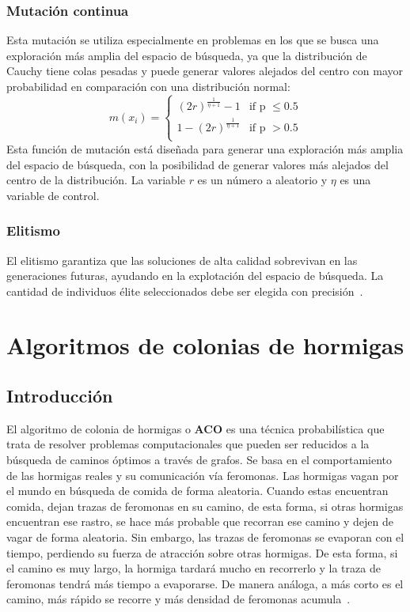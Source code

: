 \subsubsection{Mutación continua}
Esta mutación se utiliza especialmente en problemas en los que se busca una exploración más amplia del espacio de búsqueda, ya que la distribución de Cauchy tiene colas pesadas y puede generar valores alejados del centro con mayor probabilidad en comparación con una distribución normal:
\begin{equation}
    m(x_i) =
      \begin{cases}
        (2r)^{\frac{1}{\eta+1}}-1 & \text{if p $\leq 0.5$}\\
        1-(2r)^{\frac{1}{\eta+1}} & \text{if p $> 0.5$}\\
      \end{cases}       
\end{equation}
Esta función de mutación está diseñada para generar una exploración más amplia del espacio de búsqueda, con la posibilidad de generar valores más alejados del centro de la distribución. La variable $r$ es un número a aleatorio y $\eta$ es una variable de control.

\subsubsection{Elitismo}
El elitismo garantiza que las soluciones de alta calidad sobrevivan en las generaciones futuras, ayudando en la explotación del espacio de búsqueda. La cantidad de individuos élite seleccionados debe ser elegida con precisión~\cite{mirjalili2019genetic}.

\section{Algoritmos de colonias de hormigas}
\subsection{Introducción}
El algoritmo de colonia de hormigas o \textbf{ACO} es una técnica probabilística que trata de resolver problemas computacionales que pueden ser reducidos a la búsqueda de caminos óptimos a través de grafos. Se basa en el comportamiento de las hormigas reales y su comunicación vía feromonas. Las hormigas vagan por el mundo en búsqueda de comida de forma aleatoria. Cuando estas encuentran comida, dejan trazas de feromonas en su camino, de esta forma, si otras hormigas encuentran ese rastro, se hace más probable que recorran ese camino y dejen de vagar de forma aleatoria. Sin embargo, las trazas de feromonas se evaporan con el tiempo, perdiendo su fuerza de atracción sobre otras hormigas. De esta forma, si el camino es muy largo, la hormiga tardará mucho en recorrerlo y la traza de feromonas tendrá más tiempo a evaporarse. De manera análoga, a más corto es el camino, más rápido se recorre y más densidad de feromonas acumula~\cite{kashef_advanced_2015}.

